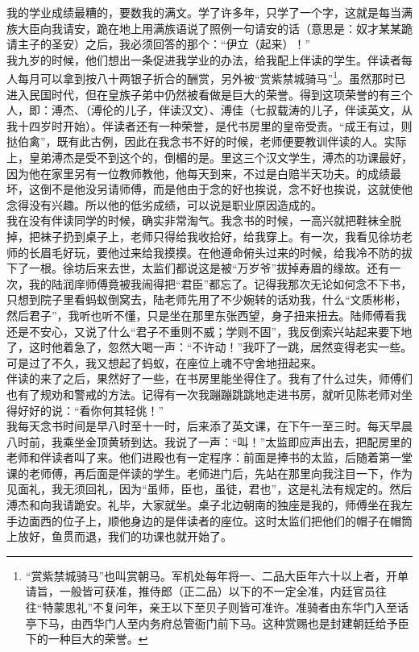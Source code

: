 我的学业成绩最糟的，要数我的满文。学了许多年，只学了一个字，这就是每当满族大臣向我请安，跪在地上用满族语说了照例一句请安的话（意思是：奴才某某跪请主子的圣安）之后，我必须回答的那个：“伊立（起来）！”\\

我九岁的时候，他们想出一条促进我学业的办法，给我配上伴读的学生。伴读者每人每月可以拿到按八十两银子折合的酬赏，另外被“赏紫禁城骑马”\footnote{“赏紫禁城骑马”也叫赏朝马。军机处每年将一、二品大臣年六十以上者，开单请旨，一般皆可获准，推侍郎（正二品）以下的不一定全准，内廷官员往往“特蒙思礼”不复问年，亲王以下至贝子则皆可准许。准骑者由东华门入至话亭下马，由西华门人至内务府总管衙门前下马。这种赏赐也是封建朝廷给予臣下的一种巨大的荣誉。}。虽然那时已进入民国时代，但在皇族子弟中仍然被看做是巨大的荣誉。得到这项荣誉的有三个人，即：溥杰、（溥伦的儿子，伴读汉文）、溥佳（七叔载涛的儿子，伴读英文，从我十四岁时开始）。伴读者还有一种荣誉，是代书房里的皇帝受责。“成王有过，则挞伯禽”，既有此古例，因此在我念书不好的时候，老师便要教训伴读的人。实际上，皇弟溥杰是受不到这个的，倒楣的是。里这三个汉文学生，溥杰的功课最好，因为他在家里另有一位教师教他，他每天到来，不过是白赔半天功夫。的成绩最坏，这倒不是他没另请师傅，而是他由于念的好也挨说，念不好也挨说，这就使他念得没有兴趣。所以他的低劣成绩，可以说是职业原因造成的。\\

我在没有伴读同学的时候，确实非常淘气。我念书的时候，一高兴就把鞋袜全脱掉，把袜子扔到桌子上，老师只得给我收拾好，给我穿上。有一次，我看见徐坊老师的长眉毛好玩，要他过来给我摸摸。在他遵命俯头过来的时候，给我冷不防的拔下了一根。徐坊后来去世，太监们都说这是被“万岁爷”拔掉寿眉的缘故。还有一次，我的陆润庠师傅竟被我闹得把“君臣”都忘了。记得我那次无论如何念不下书，只想到院子里看蚂蚁倒窝去，陆老师先用了不少婉转的话劝我，什么“文质彬彬，然后君子”，我听也听不懂，只是坐在那里东张西望，身子扭来扭去。陆师傅看我还是不安心，又说了什么“君子不重则不威；学则不固”，我反倒索兴站起来要下地了，这时他着急了，忽然大喝一声：“不许动！”我吓了一跳，居然变得老实一些。可是过了不久，我又想起了蚂蚁，在座位上魂不守舍地扭起来。\\

伴读的来了之后，果然好了一些，在书房里能坐得住了。我有了什么过失，师傅们也有了规劝和警戒的方法。记得有一次我蹦蹦跳跳地走进书房，就听见陈老师对坐得好好的说：“看你何其轻佻！”\\

我每天念书时间是早八时至十一时，后来添了英文课，在下午一至三时。每天早晨八时前，我乘坐金顶黄轿到达。我说了一声：“叫！”太监即应声出去，把配房里的老师和伴读者叫了来。他们进殿也有一定程序：前面是捧书的太监，后随着第一堂课的老师傅，再后面是伴读的学生。老师进门后，先站在那里向我注目一下，作为见面礼，我无须回礼，因为“虽师，臣也，虽徒，君也”，这是礼法有规定的。然后溥杰和向我请跪安。礼毕，大家就坐。桌子北边朝南的独座是我的，师傅坐在我左手边面西的位子上，顺他身边的是伴读者的座位。这时太监们把他们的帽子在帽筒上放好，鱼贯而退，我们的功课也就开始了。\\

